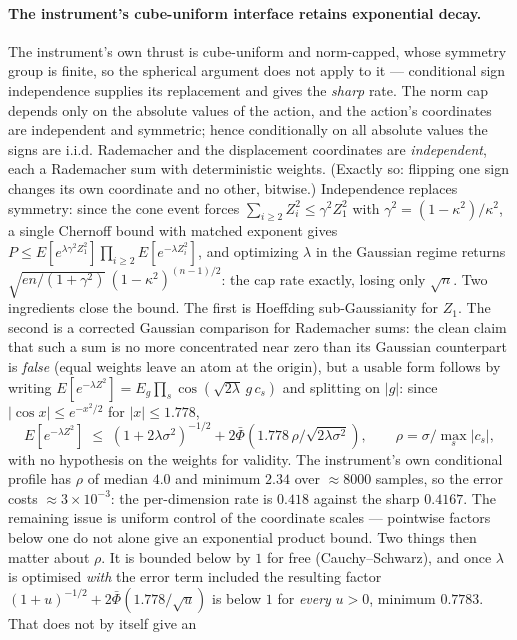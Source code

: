 \documentclass[11pt]{article}
\theoremstyle{remark}
\begin{document}
\paragraph{The instrument's cube-uniform interface retains exponential
decay.} The instrument's own thrust is cube-uniform and norm-capped,
whose
symmetry group is finite, so the spherical argument does not apply to it
--- conditional sign independence supplies its replacement and gives the
\emph{sharp} rate. The norm
cap depends only on the absolute values of the action, and the action's
coordinates are independent and symmetric; hence conditionally on all
absolute values the signs are i.i.d. Rademacher and the displacement
coordinates are \emph{independent}, each a Rademacher sum with
deterministic weights. (Exactly so: flipping one sign changes its own
coordinate and no other, bitwise.) Independence replaces symmetry: since
the cone event forces $\sum_{i \ge 2} Z_i^2 \le \gamma^2 Z_1^2$ with
$\gamma^2 = (1-\kappa^2)/\kappa^2$, a single Chernoff bound with matched
exponent gives $P \le E[e^{\lambda\gamma^2 Z_1^2}]\prod_{i\ge2}
E[e^{-\lambda Z_i^2}]$, and optimizing $\lambda$ in the Gaussian regime
returns $\sqrt{en/(1+\gamma^2)}\,(1-\kappa^2)^{(n-1)/2}$: the cap rate
exactly, losing only $\sqrt n$. Two ingredients close the bound. The
first is Hoeffding
sub-Gaussianity for $Z_1$. The second is a corrected Gaussian comparison
for Rademacher sums: the clean claim that such a sum is no more
concentrated near zero than its Gaussian counterpart is \emph{false}
(equal weights leave an atom at the origin), but a usable form follows
by writing
$E[e^{-\lambda Z^2}] = E_g\prod_s \cos(\sqrt{2\lambda}\,g\,c_s)$ and
splitting on $|g|$: since $|\cos x| \le e^{-x^2/2}$ for
$|x| \le 1.778$,
\[
  E[e^{-\lambda Z^2}] \;\le\; (1+2\lambda\sigma^2)^{-1/2}
  + 2\bar\Phi\!\left(1.778\,\rho/\sqrt{2\lambda\sigma^2}\right),
  \qquad \rho = \sigma/\max_s|c_s|,
\]
with no hypothesis on the weights for validity. The instrument's own
conditional profile has $\rho$ of median $4.0$ and minimum $2.34$ over
${\approx}8000$ samples, so the error costs ${\approx}3\times10^{-3}$:
the per-dimension rate is $0.418$ against the sharp $0.4167$. The
remaining issue is uniform control of the coordinate scales ---
pointwise factors below one do not alone give an exponential product
bound. Two things then matter about $\rho$. It is bounded below by $1$ for
free (Cauchy--Schwarz), and once $\lambda$ is optimised \emph{with} the
error term included the resulting factor
$(1+u)^{-1/2} + 2\bar\Phi(1.778/\sqrt u)$ is below $1$ for
\emph{every} $u>0$, minimum $0.7783$. That does not by itself give an
\end{document}
